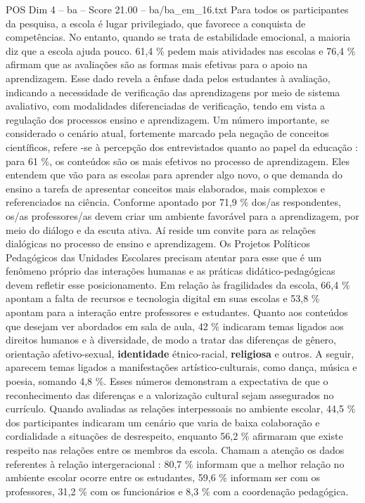 \begin{textsample}{POS Dim 4 – ba – Score 21.00 – ba/ba\_em\_16.txt}
Para todos os participantes da pesquisa, a escola é lugar privilegiado, que favorece a conquista de competências.
No entanto, quando se trata de estabilidade emocional, a maioria diz que a escola ajuda pouco. 61,4 \% pedem mais atividades nas escolas e 76,4 \% afirmam que as avaliações são as formas mais efetivas para o apoio na aprendizagem.
Esse dado revela a ênfase dada pelos estudantes à avaliação, indicando a necessidade de verificação das aprendizagens por meio de sistema avaliativo, com modalidades diferenciadas de verificação, tendo em vista a regulação dos processos ensino e aprendizagem.
Um número importante, se considerado o cenário atual, fortemente marcado pela negação de conceitos científicos, refere -se à percepção dos entrevistados quanto ao papel da educação : para 61 \%, os conteúdos são os mais efetivos no processo de aprendizagem.
Eles entendem que vão para as escolas para aprender algo novo, o que demanda do ensino a tarefa de apresentar conceitos mais elaborados, mais complexos e referenciados na ciência.
Conforme apontado por 71,9 \% dos/as respondentes, os/as professores/as devem criar um ambiente favorável para a aprendizagem, por meio do diálogo e da escuta ativa.
Aí reside um convite para as relações dialógicas no processo de ensino e aprendizagem.
Os Projetos Políticos Pedagógicos das Unidades Escolares precisam atentar para esse que é um fenômeno próprio das interações humanas e as práticas didático-pedagógicas devem refletir esse posicionamento.
Em relação às fragilidades da escola, 66,4 \% apontam a falta de recursos e tecnologia digital em suas escolas e 53,8 \% apontam para a interação entre professores e estudantes.
Quanto aos conteúdos que desejam ver abordados em sala de aula, 42 \% indicaram temas ligados aos direitos humanos e à diversidade, de modo a tratar das diferenças de gênero, orientação afetivo-sexual, \textbf{identidade} étnico-racial, \textbf{religiosa} e outros.
A seguir, aparecem temas ligados a manifestações artístico-culturais, como dança, música e poesia, somando 4,8 \%.
Esses números demonstram a expectativa de que o reconhecimento das diferenças e a valorização cultural sejam assegurados no currículo.
Quando avaliadas as relações interpessoais no ambiente escolar, 44,5 \% dos participantes indicaram um cenário que varia de baixa colaboração e cordialidade a situações de desrespeito, enquanto 56,2 \% afirmaram que existe respeito nas relações entre os membros da escola.
Chamam a atenção os dados referentes à relação intergeracional : 80,7 \% informam que a melhor relação no ambiente escolar ocorre entre os estudantes, 59,6 \% informam ser com os professores, 31,2 \% com os funcionários e 8,3 \% com a coordenação pedagógica.

\end{textsample}
